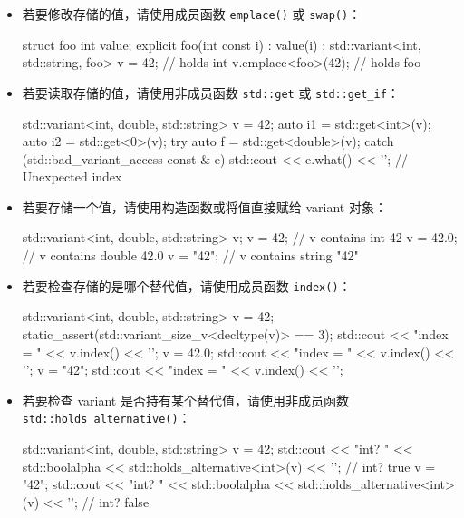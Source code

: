 \begin{itemize}
\item
若要修改存储的值，请使用成员函数 \verb|emplace()| 或 \verb|swap()|：

\begin{cpp}
struct foo
{
    int value;
    explicit foo(int const i) : value(i) {}
};
std::variant<int, std::string, foo> v = 42; // holds int
v.emplace<foo>(42);                         // holds foo
\end{cpp}

\item
若要读取存储的值，请使用非成员函数 \verb|std::get| 或 \verb|std::get_if|：

\begin{cpp}
std::variant<int, double, std::string> v = 42;
auto i1 = std::get<int>(v);
auto i2 = std::get<0>(v);
try
{
    auto f = std::get<double>(v);
}
catch (std::bad_variant_access const & e)
{
    std::cout << e.what() << '\n'; // Unexpected index
}
\end{cpp}

\item
若要存储一个值，请使用构造函数或将值直接赋给 variant 对象：

\begin{cpp}
std::variant<int, double, std::string> v;
v = 42;   // v contains int 42
v = 42.0; // v contains double 42.0
v = "42"; // v contains string "42"
\end{cpp}

\item
若要检查存储的是哪个替代值，请使用成员函数 \verb|index()|：

\begin{cpp}
std::variant<int, double, std::string> v = 42;
static_assert(std::variant_size_v<decltype(v)> == 3);
std::cout << "index = " << v.index() << '\n';
v = 42.0;
std::cout << "index = " << v.index() << '\n';
v = "42";
std::cout << "index = " << v.index() << '\n';
\end{cpp}

\item
若要检查 variant 是否持有某个替代值，请使用非成员函数 \verb|std::holds_alternative()|：

\begin{cpp}
std::variant<int, double, std::string> v = 42;
std::cout << "int? " << std::boolalpha
          << std::holds_alternative<int>(v)
          << '\n'; // int? true
v = "42";
std::cout << "int? " << std::boolalpha
          << std::holds_alternative<int>(v)
          << '\n'; // int? false
\end{cpp}


\end{itemize}
